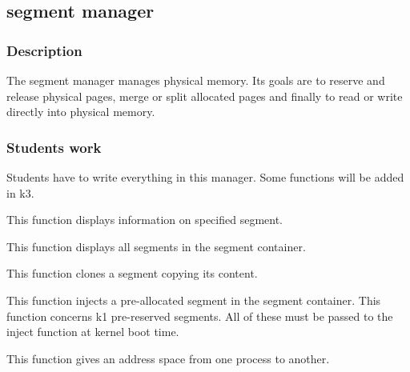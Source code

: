 \subsection{segment manager}

\subsubsection{Description}

The segment manager manages physical  memory. Its goals are to reserve
and release physical pages, merge or split allocated pages and finally
to read or write directly into physical memory.

\subsubsection{Students work}

Students have to write everything in this manager. Some functions will
be added in k3.


This function displays information on specified segment.


This function displays all segments in the segment container.


This function clones a segment copying its content.


This  function   injects  a  pre-allocated  segment   in  the  segment
container.  This function  concerns k1  pre-reserved segments.  All of
these must be passed to the inject function at kernel boot time.


This function gives an address space from one process to another.


